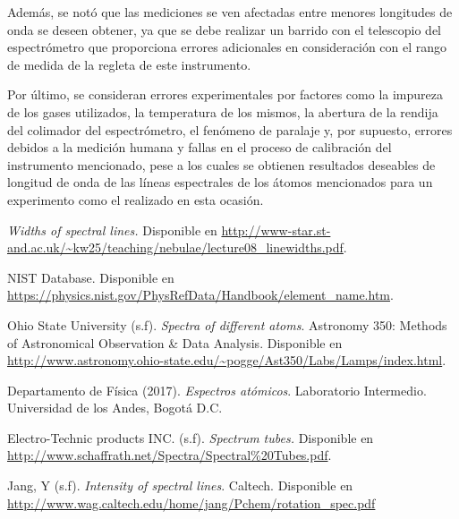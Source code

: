 \documentclass[%
 reprint,
 amsmath,amssymb,
 aps,
]{revtex4-1}
\begin{document}
Además, se notó que las mediciones se ven afectadas entre menores longitudes de onda se deseen obtener, ya que se debe realizar un barrido con el telescopio del espectrómetro que proporciona errores adicionales en consideración con el rango de medida de la regleta de este instrumento.

Por último, se consideran errores experimentales por factores como la impureza de los gases utilizados, la temperatura de los mismos, la abertura de la rendija del colimador del espectrómetro, el fenómeno de paralaje y, por supuesto, errores debidos a la medición humana y fallas en el proceso de calibración del instrumento mencionado, pese a los cuales se obtienen resultados deseables de longitud de onda de las líneas espectrales de los átomos mencionados para un experimento como el realizado en esta ocasión.


\begin{thebibliography}{}

 \textit{Widths of spectral lines.} Disponible en \url{http://www-star.st-and.ac.uk/~kw25/teaching/nebulae/lecture08_linewidths.pdf}. 

 NIST Database. Disponible en  \url{https://physics.nist.gov/PhysRefData/Handbook/element_name.htm}.

 Ohio State University (s.f). \textit{Spectra of different atoms}. Astronomy 350: Methods of Astronomical Observation & Data Analysis.
Disponible en \url{http://www.astronomy.ohio-state.edu/~pogge/Ast350/Labs/Lamps/index.html}.

 Departamento de Física (2017). \textit{Espectros atómicos}. Laboratorio Intermedio. Universidad de los Andes, Bogotá D.C.

 Electro-Technic products INC. (s.f). \textit{Spectrum tubes.} Disponible en \url{http://www.schaffrath.net/Spectra/Spectral\%20Tubes.pdf}.

 Jang, Y (s.f). \textit{Intensity of spectral lines}. Caltech. Disponible en \url{ http://www.wag.caltech.edu/home/jang/Pchem/rotation_spec.pdf}

\end{thebibliography}
\end{document}
